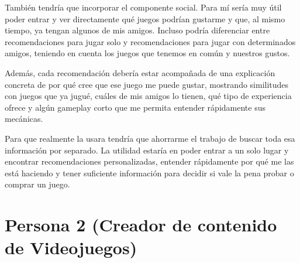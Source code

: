 \begin{description}[leftmargin=0cm, style=nextline]
	También tendría que incorporar el componente social. Para mí sería muy útil poder entrar y ver directamente qué juegos podrían gustarme y que, al mismo tiempo, ya tengan algunos de mis amigos. Incluso podría diferenciar entre recomendaciones para jugar solo y recomendaciones para jugar con determinados amigos, teniendo en cuenta los juegos que tenemos en común y nuestros gustos.

	Además, cada recomendación debería estar acompañada de una explicación concreta de por qué cree que ese juego me puede gustar, mostrando similitudes con juegos que ya jugué, cuáles de mis amigos lo tienen, qué tipo de experiencia ofrece y algún gameplay corto que me permita entender rápidamente sus mecánicas.

	Para que realmente la usara tendría que ahorrarme el trabajo de buscar toda esa información por separado. La utilidad estaría en poder entrar a un solo lugar y encontrar recomendaciones personalizadas, entender rápidamente por qué me las está haciendo y tener suficiente información para decidir si vale la pena probar o comprar un juego.
\end{description}

\section*{Persona 2 (Creador de contenido de Videojuegos)}

